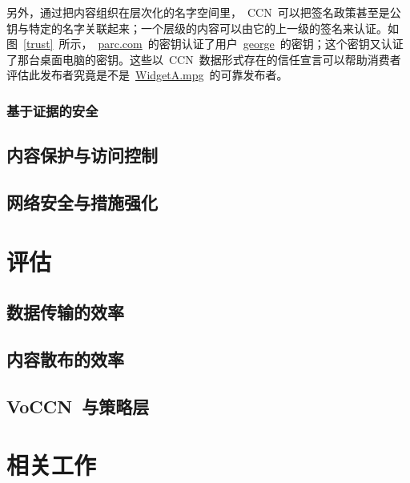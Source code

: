 另外，通过把内容组织在层次化的名字空间里，~CCN~可以把签名政策甚至是公钥与特定的名字关联起来；一个层级的内容可以由它的上一级的签名来认证。如图~\ref{trust}~所示，~\url{parc.com}~的密钥认证了用户~\url{george}~的密钥；这个密钥又认证了那台桌面电脑的密钥。这些以~CCN~数据形式存在的信任宣言可以帮助消费者评估此发布者究竟是不是~\url{WidgetA.mpg}~的可靠发布者。

\subsubsection{基于证据的安全}
\label{sec:5.2.2}

\subsection{内容保护与访问控制}
\label{sec:5.3}

\subsection{网络安全与措施强化}
\label{sec:5.4}

\section{评估}
\label{sec:6}

\subsection{数据传输的效率}
\label{sec:6.1}
	
\subsection{内容散布的效率}
\label{sec:6.2}

\subsection{VoCCN~与策略层}
\label{sec:6.3}

\section{相关工作}
\label{sec:7}


